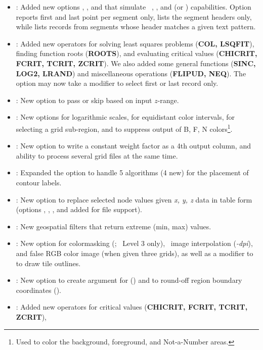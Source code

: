 \begin{description}
\begin{itemize}
\item {}:	Added new options , ,  and  that simulate
\UNIX\ , , and   (or ) capabilities.
Option  reports first and last point per segment only,  lists the segment headers only,
while  lists records from segments whose header matches a given text pattern.
\item {}:	Added new operators for solving least squares problems (\textbf{COL, LSQFIT}),
finding function roots (\textbf{ROOTS}), and evaluating critical values (\textbf{CHICRIT, FCRIT, TCRIT, ZCRIT}).
We also added some general functions (\textbf{SINC, LOG2, LRAND}) and miscellaneous operations (\textbf{FLIPUD, NEQ}).
The  option may now take a modifier to select first or last record only.
\item {}:	New option   to pass or skip based on input $z$-range.
\item {}:	New options   for logarithmic scales,  for equidistant color
intervals,  for selecting a grid sub-region, and  to suppress output of B, F, N colors\footnote{Used
to color the background, foreground, and Not-a-Number areas.}.
\item {}:	New option  to write a constant weight factor as a 4th output column,
and ability to process several grid files at the same time.
\item {}:	Expanded the  option to handle 5 algorithms (4 new) for the placement
of contour labels. 
\item {}:	New option  to replace selected node values given \emph{x, y, z} data
in table form (options , , , and \Opt{:} added for file support).
\item {}:	New geospatial filters  that return extreme (min, max) values. 
\item {}:	New option for colormasking (; \PS\ Level 3 only), \PS\ image 
interpolation (\emph{-dpi}), and false RGB color image (when given three grids), as well as a modifier to 
to draw tile outlines.
\item {}:	New option to create argument for  () and to round-off
region boundary coordinates (). 
\item {}:	Added new operators for critical values (\textbf{CHICRIT, FCRIT, TCRIT, ZCRIT}),

\end{itemize}
\end{description}

